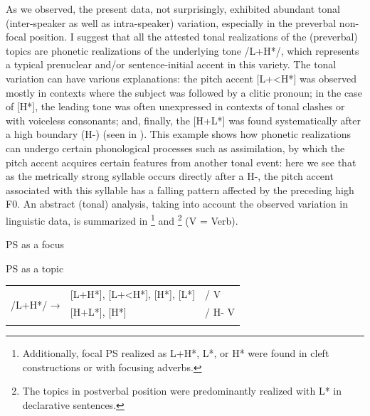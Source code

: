 \documentclass[output=paper]{langsci/langscibook}
\begin{document}
As we observed, the present data, not surprisingly, exhibited abundant tonal (inter-speaker as well as intra-speaker) variation, especially in the preverbal non-focal position. I suggest that all the attested tonal realizations of the (preverbal) topics are phonetic realizations of the underlying tone /L+H*/, which represents a typical prenuclear and/or sentence-initial accent in this variety. The tonal variation can have various explanations: the pitch accent [L+<H*] was observed mostly in contexts where the subject was followed by a clitic pronoun; in the case of [H*], the leading tone was often unexpressed in contexts of tonal clashes or with voiceless consonants; and, finally, the [H+L*] was found systematically after a high boundary (H-) (seen in ). This example shows how phonetic realizations can undergo certain phonological processes such as assimilation, by which the pitch accent acquires certain features from another tonal event: here we see that as the metrically strong syllable occurs directly after a H-, the pitch accent associated with this syllable has a falling pattern affected by the preceding high F0. An abstract (tonal) analysis, taking into account the observed variation in linguistic data, is summarized in \footnote{Additionally, focal PS realized as L+H*, L*, or H* were found in cleft constructions or with focusing adverbs.} and \footnote{The topics in postverbal position were predominantly realized with L* in declarative sentences.} (V = Verb).\largerpage

\ea\label{ex:pes:10}
{PS as a focus}\\
\z



\ea\label{ex:pes:11}
{PS as a topic}\\
\begin{tabular}{lll}
\multirow{3}{*}{/L+H*/  →}  & [L+H*], [L+<H*], [H*], [L*]                   &/  {\longrule} V \\{}
				&  [H+L*], [H*]    &/ H-{\longrule} V\\{}
             
\end{tabular}
\z
\end{document}
